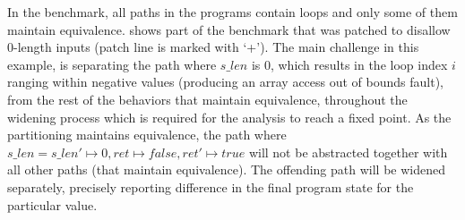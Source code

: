 %
%

In the  benchmark, all paths in the programs contain loops and only some of them maintain equivalence.  shows part of the benchmark that was patched to disallow 0-length inputs (patch line is marked with `+'). The main challenge in this example, is separating the path where $s\_len$ is 0, which results in the loop index $i$ ranging within negative values (producing an array access out of bounds fault), from the rest of the behaviors that maintain equivalence, throughout the widening process which is required for the analysis to reach a fixed point. As the partitioning maintains equivalence, the path where $s\_len = s\_len' \mapsto 0, ret \mapsto false, ret' \mapsto true$ will not be abstracted together with all other paths (that maintain equivalence). The offending path will be widened separately, precisely reporting difference in the final program state for the particular value.

